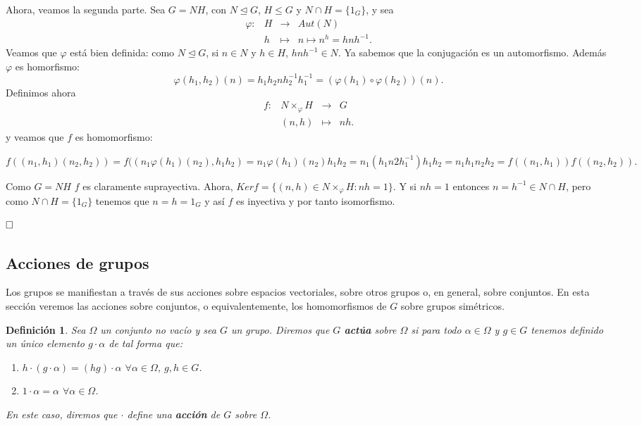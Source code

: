 \documentclass[12pt]{article}
\newtheorem{definition}[theorem]{Definición}
\begin{document}
Ahora, veamos la segunda parte. Sea $G=NH$, con $N \unlhd G$, $H\leq G$ y $N \cap H = \lbrace 1_{G} \rbrace$, y sea 
$$\begin{array}{rccl}
\varphi\colon &H & \longrightarrow & Aut(N)\\
&h& \longmapsto &n \longmapsto n^{h} = hnh^{-1}.
\end{array}
$$
Veamos que $\varphi$ está bien definida: como $N \unlhd G$, si $n \in N$ y $h \in H$, $hnh^{-1} \in N$. Ya sabemos que la conjugación es un automorfismo. Además $\varphi$ es homorfismo: $$\varphi(h_{1},h_{2})(n)=h_{1}h_{2}nh_{2}^{-1}h_{1}^{-1}=(\varphi(h_{1}) \circ \varphi(h_{2}))(n).$$
Definimos ahora $$\begin{array}{rccl}
f\colon &N \times _{\varphi} H & \longrightarrow & G\\
&(n,h)& \longmapsto &nh.
\end{array}
$$
y veamos que $f$ es homomorfismo: \begin{center}$f((n_{1},h_{1})(n_{2},h_{2}))=f((n_{1}\varphi(h_{1})(n_{2}),h_{1}h_{2})=n_{1}\varphi(h_{1})(n_{2})h_{1}h_{2}=n_{1}(h_{1}n2h_{1}^{-1})h_{1}h_{2}=n_{1}h_{1}n_{2}h_{2}=f((n_{1},h_{1}))f((n_{2},h_{2})).$\end{center}

Como $G=NH$ $f$ es claramente suprayectiva. Ahora, $Ker f= \lbrace (n,h) \in N\times_{\varphi} H :nh=1 \rbrace$. Y si $nh=1$ entonces $n=h^{-1}\in N \cap H$, pero como $N \cap H = \lbrace 1_{G} \rbrace$ tenemos que $n=h=1_{G}$ y así $f$ es inyectiva y por tanto isomorfismo.

$\hfill \square$

\subsection{Acciones de grupos}

Los grupos se manifiestan a través de sus acciones sobre espacios vectoriales, sobre otros grupos o, en general, sobre conjuntos. En esta sección veremos las acciones sobre conjuntos, o equivalentemente, los homomorfismos de $G$ sobre grupos simétricos.

\begin{definition}Sea $\Omega$ un conjunto no vacío y sea $G$ un grupo. Diremos que $G$ \textbf{actúa} sobre $\Omega$ si para todo $\alpha \in \Omega$ y $g \in G$ tenemos definido un único elemento $g \cdot \alpha$ de tal forma que:
\begin{enumerate}
\item $h \cdot (g \cdot \alpha)=(hg) \cdot \alpha$ $\forall \alpha \in \Omega$, $g,h \in G$.
\item $1 \cdot \alpha =\alpha$ $\forall \alpha \in \Omega$.
\end{enumerate}

En este caso, diremos que $\cdot$ define una \textbf{acción} de $G$ sobre $\Omega$.
\end{definition}
\end{document}
